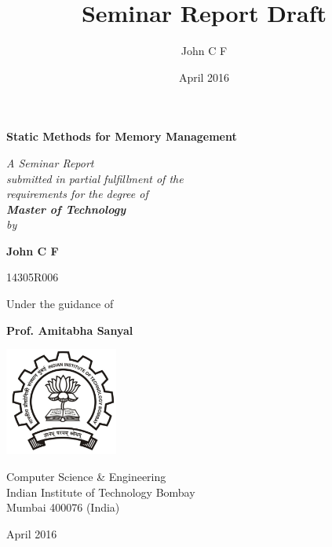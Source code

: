 \documentclass[11pt]{report}
\title{Seminar Report Draft}
\author{John C F}
\date{April 2016}
\begin{document}
\begin{titlepage}
    \begin{center}
        {\LARGE \bfseries Static Methods for Memory Management \par}
        { \large \em {} 
            A Seminar Report \\ [.25\baselineskip] 
            submitted in partial fulfillment of the \\ [.25\baselineskip] 
            requirements for the degree of \\ [.25\baselineskip] 
            { \bfseries  Master of Technology } \\ [.5\baselineskip] 
            by \par
        }
        {\large \bfseries John C F\par}
        \vspace{.25\baselineskip}
        {\large 14305R006}

        {\large Under the guidance of\par}\vspace{.25\baselineskip}
        {\large \bfseries Prof. Amitabha Sanyal \par}

        \includegraphics[width=10em]{iitb-black}

        {
            {\large Computer Science \& Engineering\\[0.25\baselineskip]
                Indian Institute of Technology Bombay \\[0.25\baselineskip]
                Mumbai 400076  (India) }
            \\[0.5\baselineskip]
            {\large April 2016 \par}
        }
    \end{center}
\end{titlepage}
\end{document}
